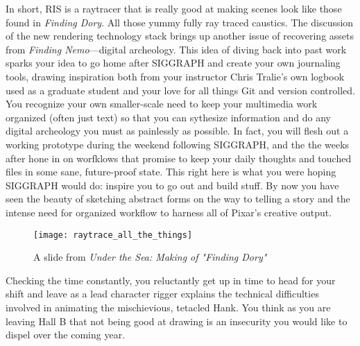 \documentclass[../main.tex]{subfiles}
\begin{document}
In short, RIS is a raytracer that is really good at making scenes look like those found in \textit{Finding Dory}. All those yummy fully ray traced caustics. The discussion of the new rendering technology stack brings up another issue of recovering assets from \textit{Finding Nemo}---digital archeology. This idea of diving back into past work sparks your idea to go home after SIGGRAPH and create your own journaling tools, drawing inspiration both from your instructor Chris Tralie's own logbook used as a graduate student and your love for all things Git and version controlled. You recognize your own smaller-scale need to keep your multimedia work organized (often just text) so that you can sythesize information and do any digital archeology you must as painlessly as possible. In fact, you will flesh out a working prototype during the weekend following SIGGRAPH, and the the weeks after hone in on worfklows that promise to keep your daily thoughts and touched files in some sane, future-proof state. This right here is what you were hoping SIGGRAPH would do: inspire you to go out and build stuff. By now you have seen the beauty of sketching abstract forms on the way to telling a story and the intense need for organized workflow to harness all of Pixar's creative output.

\begin{figure}[h!]
	\centering
	\texttt{[image: raytrace\_all\_the\_things]}
	\caption*{A slide from \textit{Under the Sea: Making of "Finding Dory"}}
\end{figure}

Checking the time constantly, you reluctantly get up in time to head for your shift and leave as a lead character rigger explains the technical difficulties involved in animating the mischievious, tetacled Hank. You think as you are leaving Hall B that not being good at drawing is an insecurity you would like to dispel over the coming year.
\end{document}
